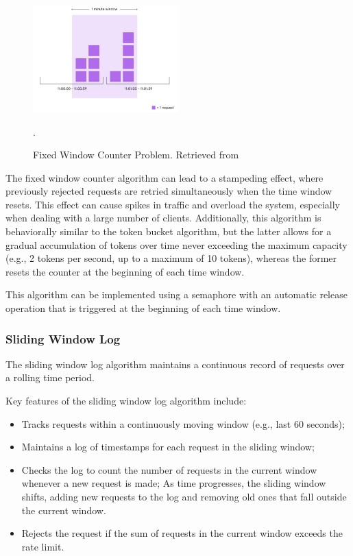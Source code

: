 \begin{figure}[!htb]
    \centering
    \includegraphics[width=0.5\textwidth]{../figures/06_fixed-window-counter-problem}
    \caption{Fixed Window Counter Problem.
    Retrieved from~\cite{medium-rate-limiting-algorithms}}.
    \label{fig:fixed-window-counter-problem}
\end{figure}

The fixed window counter algorithm can lead to a stampeding effect,
where previously rejected requests are retried simultaneously when the time window resets.
This effect can cause spikes in traffic and overload the system, especially when dealing with a large number of clients.
Additionally, this algorithm is behaviorally similar to the token bucket algorithm,
but the latter allows for a gradual accumulation of tokens over time never exceeding the maximum capacity
(e.g., 2 tokens per second, up to a maximum of 10 tokens), whereas the former resets the counter at the beginning of each time window.

This algorithm can be implemented using a semaphore with an automatic release operation that is triggered at the beginning of each time window.

\subsubsection{Sliding Window Log}\label{subsubsec:sliding-window-log-algorithm}

The sliding window log algorithm maintains a continuous record of requests over a rolling time period.

Key features of the sliding window log algorithm include:

\begin{itemize}
    \item Tracks requests within a continuously moving window (e.g., last 60 seconds);
    \item Maintains a log of timestamps for each request in the sliding window;
    \item Checks the log to count the number of requests in the current window whenever a new request is made;
    \itme As time progresses, the sliding window shifts, adding new requests to the log and removing old ones that fall outside the current window.
    \item Rejects the request if the sum of requests in the current window exceeds the rate limit.
\end{itemize}

